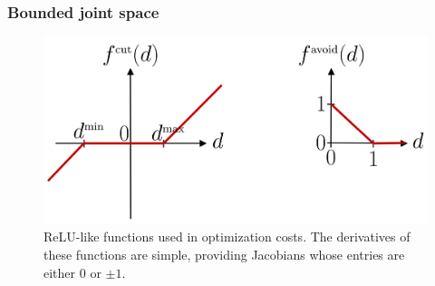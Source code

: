 \documentclass[10pt,a4paper]{article} %
\newcommand{\trsp}{{\scriptscriptstyle\top}}
\begin{document}


\subsubsection{Bounded joint space}


\begin{figure}
\vspace{-20pt}
\centering
\includegraphics[width=.34\textwidth]{images/fcut01.png}
\caption{\footnotesize
ReLU-like functions used in optimization costs. The derivatives of these functions are simple, providing Jacobians whose entries are either $0$ or $\pm 1$.
}
\label{fig:fcut}
\vspace{-60pt}
\end{figure}
\end{document}
